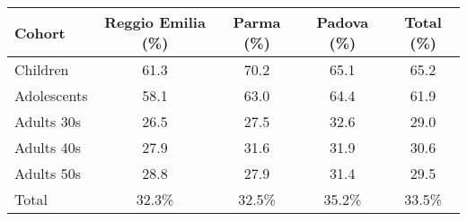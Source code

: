 \begin{tabular}{ l c c c c }
\toprule
Cohort & Reggio Emilia (\%) & Parma (\%) & Padova (\%) & Total (\%) \\
\midrule
Children   & 61.3  & 70.2  & 65.1  & 65.2 \\
Adolescents      & 58.1  & 63.0  & 64.4  & 61.9 \\
Adults 30s        & 26.5  & 27.5  & 32.6  & 29.0 \\
Adults 40s        & 27.9  & 31.6  & 31.9  & 30.6 \\
Adults 50s         & 28.8  & 27.9  & 31.4  & 29.5 \\
\midrule
Total         & 32.3\%  & 32.5\% & 35.2\% & 33.5\% \\
\bottomrule
\end{tabular}
